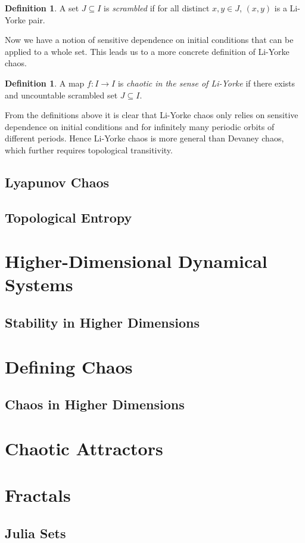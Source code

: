\documentclass[11pt,a4paper,oneside]{memoir}
\theoremstyle{plain}
\theoremstyle{definition}
\newtheorem{defn}[thm]{Definition}
\begin{document}
\begin{defn}
    A set $J \subseteq I$ is \emph{scrambled} if for all distinct $x, y \in J$, $(x, y)$ is a Li-Yorke pair.
\end{defn}

Now we have a notion of sensitive dependence on initial conditions that can be applied to a whole set. This leads us to a more concrete definition of Li-Yorke chaos.

\begin{defn}
    A map $f: I \to I$ is \emph{chaotic in the sense of Li-Yorke} if there exists and uncountable scrambled set $J \subseteq I$.
\end{defn}

From the definitions above it is clear that Li-Yorke chaos only relies on sensitive dependence on initial conditions and for infinitely many periodic orbits of different periods. Hence Li-Yorke chaos is more general than Devaney chaos, which further requires topological transitivity.

\section{Lyapunov Chaos}

\section{Topological Entropy}

\chapter{Higher-Dimensional Dynamical Systems}
\section{Stability in Higher Dimensions}

\chapter{Defining Chaos}
\section{Chaos in Higher Dimensions}
\chapter{Chaotic Attractors}

\chapter{Fractals}
\section{Julia Sets}


\end{document}
